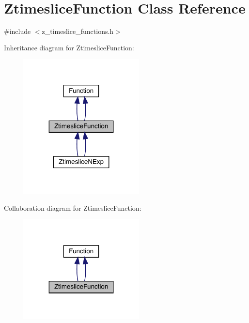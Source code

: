 \hypertarget{classZtimesliceFunction}{}\section{Ztimeslice\+Function Class Reference}
\label{classZtimesliceFunction}


{\ttfamily \#include $<$z\+\_\+timeslice\+\_\+functions.\+h$>$}



Inheritance diagram for Ztimeslice\+Function\+:
\nopagebreak
\begin{figure}[H]
\begin{center}
\leavevmode
\includegraphics[width=179pt]{d5/dee/classZtimesliceFunction__inherit__graph}
\end{center}
\end{figure}


Collaboration diagram for Ztimeslice\+Function\+:
\nopagebreak
\begin{figure}[H]
\begin{center}
\leavevmode
\includegraphics[width=179pt]{d5/d2b/classZtimesliceFunction__coll__graph}
\end{center}
\end{figure}
